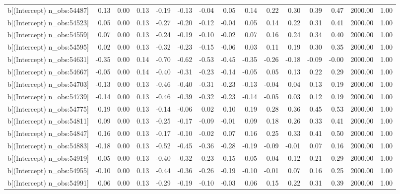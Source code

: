 \begin{table}[ht]
\begin{tabular}{rrrrrrrrrrrrrrr}
  b[(Intercept) n\_obs:54487] & 0.13 & 0.00 & 0.13 & -0.19 & -0.13 & -0.04 & 0.05 & 0.14 & 0.22 & 0.30 & 0.39 & 0.47 & 2000.00 & 1.00 \\ 
  b[(Intercept) n\_obs:54523] & 0.05 & 0.00 & 0.13 & -0.27 & -0.20 & -0.12 & -0.04 & 0.05 & 0.14 & 0.22 & 0.31 & 0.41 & 2000.00 & 1.00 \\ 
  b[(Intercept) n\_obs:54559] & 0.07 & 0.00 & 0.13 & -0.24 & -0.19 & -0.10 & -0.02 & 0.07 & 0.16 & 0.24 & 0.34 & 0.40 & 2000.00 & 1.00 \\ 
  b[(Intercept) n\_obs:54595] & 0.02 & 0.00 & 0.13 & -0.32 & -0.23 & -0.15 & -0.06 & 0.03 & 0.11 & 0.19 & 0.30 & 0.35 & 2000.00 & 1.00 \\ 
  b[(Intercept) n\_obs:54631] & -0.35 & 0.00 & 0.14 & -0.70 & -0.62 & -0.53 & -0.45 & -0.35 & -0.26 & -0.18 & -0.09 & -0.00 & 2000.00 & 1.00 \\ 
  b[(Intercept) n\_obs:54667] & -0.05 & 0.00 & 0.14 & -0.40 & -0.31 & -0.23 & -0.14 & -0.05 & 0.05 & 0.13 & 0.22 & 0.29 & 2000.00 & 1.00 \\ 
  b[(Intercept) n\_obs:54703] & -0.13 & 0.00 & 0.13 & -0.46 & -0.40 & -0.31 & -0.23 & -0.13 & -0.04 & 0.04 & 0.13 & 0.19 & 2000.00 & 1.00 \\ 
  b[(Intercept) n\_obs:54739] & -0.14 & 0.00 & 0.13 & -0.46 & -0.39 & -0.32 & -0.23 & -0.14 & -0.05 & 0.03 & 0.12 & 0.19 & 2000.00 & 1.00 \\ 
  b[(Intercept) n\_obs:54775] & 0.19 & 0.00 & 0.13 & -0.14 & -0.06 & 0.02 & 0.10 & 0.19 & 0.28 & 0.36 & 0.45 & 0.53 & 2000.00 & 1.00 \\ 
  b[(Intercept) n\_obs:54811] & 0.09 & 0.00 & 0.13 & -0.25 & -0.17 & -0.09 & -0.01 & 0.09 & 0.18 & 0.26 & 0.33 & 0.41 & 2000.00 & 1.00 \\ 
  b[(Intercept) n\_obs:54847] & 0.16 & 0.00 & 0.13 & -0.17 & -0.10 & -0.02 & 0.07 & 0.16 & 0.25 & 0.33 & 0.41 & 0.50 & 2000.00 & 1.00 \\ 
  b[(Intercept) n\_obs:54883] & -0.18 & 0.00 & 0.13 & -0.52 & -0.45 & -0.36 & -0.28 & -0.19 & -0.09 & -0.01 & 0.07 & 0.16 & 2000.00 & 1.00 \\ 
  b[(Intercept) n\_obs:54919] & -0.05 & 0.00 & 0.13 & -0.40 & -0.32 & -0.23 & -0.15 & -0.05 & 0.04 & 0.12 & 0.21 & 0.29 & 2000.00 & 1.00 \\ 
  b[(Intercept) n\_obs:54955] & -0.10 & 0.00 & 0.13 & -0.44 & -0.36 & -0.26 & -0.19 & -0.10 & -0.01 & 0.07 & 0.16 & 0.25 & 2000.00 & 1.00 \\ 
  b[(Intercept) n\_obs:54991] & 0.06 & 0.00 & 0.13 & -0.29 & -0.19 & -0.10 & -0.03 & 0.06 & 0.15 & 0.22 & 0.31 & 0.39 & 2000.00 & 1.00 \\ 

\end{tabular}
\end{table}
